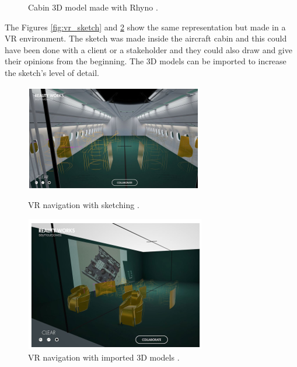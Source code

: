 \begin{figure}[h]
\begin{minipage}{.45\textwidth}
    \caption{Cabin 3D model made with Rhyno \cite{moerland2021application}.}
    \label{fig:cabin_3d_model}
\end{minipage}
\end{figure}

The Figures \ref{fig:vr_sketch} and \ref{fig:vr_3d_model} show the same representation but made in a VR environment. The sketch was made inside the aircraft cabin and this could have been done with a client or a stakeholder and they could also draw and give their opinions from the beginning. The 3D models can be imported to increase the sketch's level of detail.

\begin{figure}[h]
\centering
\begin{minipage}{.45\textwidth}
    \centering
    \vspace{1.5cm}
    \includegraphics[width = \linewidth]{Revisao/VR Cabin/VR sketch.png}
    \caption{VR navigation with sketching \cite{moerland2021application}.}
    \label{fig:vr_sketch}
\end{minipage}
\hfil
\begin{minipage}{.45\textwidth}
    \centering

    \includegraphics[width = \linewidth]{Revisao/VR Cabin/VR 3D Model.png}
    \caption{VR navigation with imported 3D models \cite{moerland2021application}.}
    \label{fig:vr_3d_model}
\end{minipage}
\end{figure}

